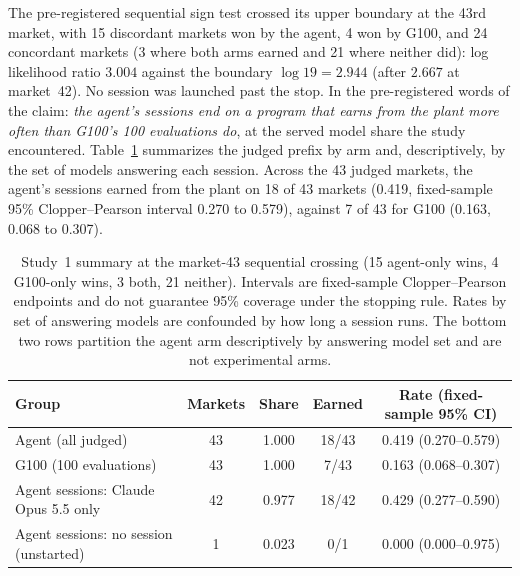 \documentclass[11pt]{article}
\begin{document}
The pre-registered sequential sign test crossed its upper boundary at the 43rd market, with 15 discordant markets won by the agent, 4 won by G100, and 24 concordant markets (3 where both arms earned and 21 where neither did): log likelihood ratio $3.004$ against the boundary $\log 19 = 2.944$ (after $2.667$ at market~42). No session was launched past the stop. In the pre-registered words of the claim: \emph{the agent's sessions end on a program that earns from the plant more often than G100's 100 evaluations do}, at the served model share the study encountered. Table~\ref{tab:study1-result} summarizes the judged prefix by arm and, descriptively, by the set of models answering each session. Across the 43 judged markets, the agent's sessions earned from the plant on 18 of 43 markets (0.419, fixed-sample 95\% Clopper--Pearson interval 0.270 to 0.579), against 7 of 43 for G100 (0.163, 0.068 to 0.307).

\begin{table}[ht]
\centering
\small
\begin{tabular}{@{}lcccc@{}}
\toprule
Group & Markets & Share & Earned & Rate (fixed-sample 95\% CI) \\
\midrule
Agent (all judged) & 43 & 1.000 & 18/43 & 0.419 (0.270--0.579) \\
G100 (100 evaluations) & 43 & 1.000 & 7/43 & 0.163 (0.068--0.307) \\
\midrule
Agent sessions: Claude Opus 5.5 only & 42 & 0.977 & 18/42 & 0.429 (0.277--0.590) \\
Agent sessions: no session (unstarted) & 1 & 0.023 & 0/1 & 0.000 (0.000--0.975) \\
\bottomrule
\end{tabular}
\caption{Study~1 summary at the market-43 sequential crossing (15 agent-only wins, 4 G100-only wins, 3 both, 21 neither). Intervals are fixed-sample Clopper--Pearson endpoints and do not guarantee 95\% coverage under the stopping rule. Rates by set of answering models are confounded by how long a session runs. The bottom two rows partition the agent arm descriptively by answering model set and are not experimental arms.}
\label{tab:study1-result}
\end{table}
\end{document}
